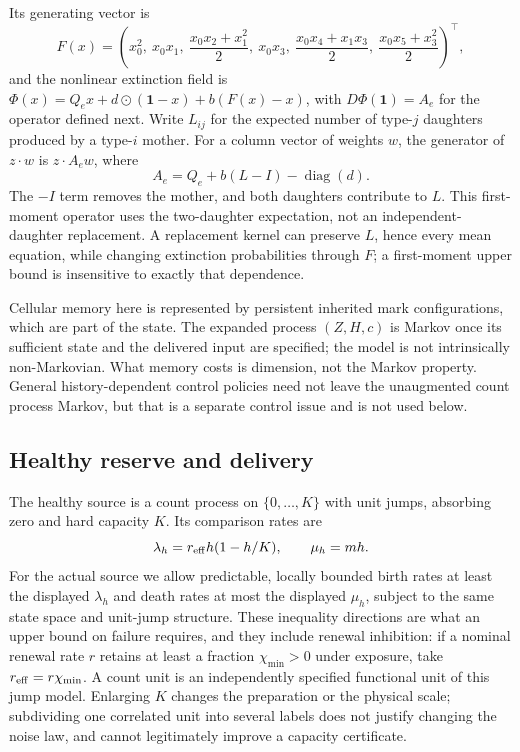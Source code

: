 Its generating vector is
\begin{equation}\label{eq:F}
 F(x)=\left(x_0^2,\ x_0x_1,\ \frac{x_0x_2+x_1^2}{2},\
 x_0x_3,\ \frac{x_0x_4+x_1x_3}{2},\ \frac{x_0x_5+x_3^2}{2}\right)^{\!\top},
\end{equation}
and the nonlinear extinction field is
$\Phi(x)=Q_ex+d\odot(\mathbf 1-x)+b(F(x)-x)$, with $D\Phi(\mathbf 1)=A_e$ for the operator defined next. Write $L_{ij}$ for the expected number of type-$j$ daughters produced by a type-$i$ mother. For a column vector of weights $w$, the generator of $z\cdot w$ is $z\cdot A_ew$, where
\begin{equation}\label{eq:A}
 A_e=Q_e+b(L-I)-\operatorname{diag}(d).
\end{equation}
The $-I$ term removes the mother, and both daughters contribute to $L$. This first-moment operator uses the two-daughter expectation, not an independent-daughter replacement. A replacement kernel can preserve $L$, hence every mean equation, while changing extinction probabilities through $F$; a first-moment upper bound is insensitive to exactly that dependence.

\begin{remark}\label{rem:markov}
Cellular memory here is represented by persistent inherited mark configurations, which are part of the state. The expanded process $(Z,H,c)$ is Markov once its sufficient state and the delivered input are specified; the model is not intrinsically non-Markovian. What memory costs is dimension, not the Markov property. General history-dependent control policies need not leave the unaugmented count process Markov, but that is a separate control issue and is not used below.
\end{remark}

\subsection{Healthy reserve and delivery}
The healthy source is a count process on $\{0,\ldots,K\}$ with unit jumps, absorbing zero and hard capacity $K$. Its comparison rates are
\begin{equation}\label{eq:healthy}
 \lambda_h=r_{\mathrm{eff}} h(1-h/K),\qquad \mu_h=mh.
\end{equation}
For the actual source we allow predictable, locally bounded birth rates at least the displayed $\lambda_h$ and death rates at most the displayed $\mu_h$, subject to the same state space and unit-jump structure. These inequality directions are what an upper bound on failure requires, and they include renewal inhibition: if a nominal renewal rate $r$ retains at least a fraction $\chi_{\min}>0$ under exposure, take $r_{\mathrm{eff}}=r\chi_{\min}$. A count unit is an independently specified functional unit of this jump model. Enlarging $K$ changes the preparation or the physical scale; subdividing one correlated unit into several labels does not justify changing the noise law, and cannot legitimately improve a capacity certificate.

